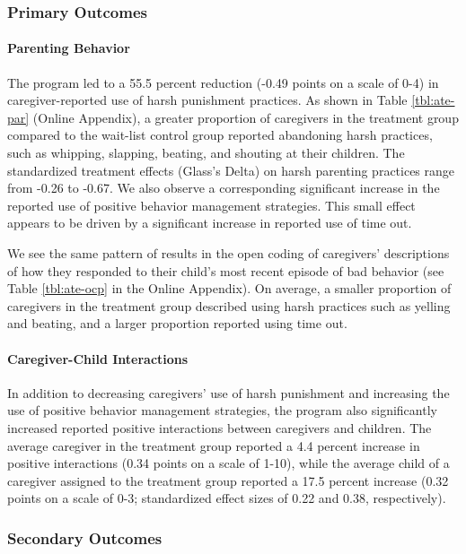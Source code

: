 \documentclass[12pt,authoryear]{elsarticle}\usepackage{knitr}
\begin{document}
\subsubsection*{Primary Outcomes}

\paragraph*{Parenting Behavior}

The program led to a 55.5 percent reduction (-0.49 points on a scale of 0-4) in caregiver-reported use of harsh punishment practices. As shown in Table \ref{tbl:ate-par} (Online Appendix), a greater proportion of caregivers in the treatment group compared to the wait-list control group reported abandoning harsh practices, such as whipping, slapping, beating, and shouting at their children. The standardized treatment effects (Glass's Delta) on harsh parenting practices range from -0.26 to -0.67. We also observe a corresponding significant increase in the reported use of positive behavior management strategies. This small effect appears to be driven by a significant increase in reported use of time out.  

We see the same pattern of results in the open coding of caregivers' descriptions of how they responded to their child's most recent episode of bad behavior (see Table \ref{tbl:ate-ocp} in the Online Appendix). On average, a smaller proportion of caregivers in the treatment group described using harsh practices such as yelling and beating, and a larger proportion reported using time out. 

\paragraph*{Caregiver-Child Interactions}

In addition to decreasing caregivers' use of harsh punishment and increasing the use of positive behavior management strategies, the program also significantly increased reported positive interactions between caregivers and children. The average caregiver in the treatment group reported a 4.4 percent increase in positive interactions (0.34 points on a scale of 1-10), while the average child of a caregiver assigned to the treatment group reported a 17.5 percent increase (0.32 points on a scale of 0-3; standardized effect sizes of 0.22 and 0.38, respectively).

\subsubsection*{Secondary Outcomes}
\end{document}
